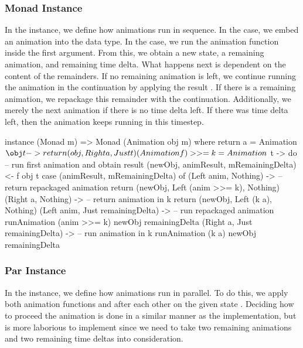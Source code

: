 \subsubsection{Monad Instance}

In the  instance, we define how animations run in sequence. In the  case, we embed an animation into the  data type. In the \hs{>>=} case, we run the animation function inside the first argument. From this, we obtain a new state, a remaining animation, and remaining time delta. What happens next is dependent on the content of the remainders. If no remaining animation is left, we continue running the animation in the continuation  by applying the result . If there is a remaining animation, we repackage this remainder with the continuation. Additionally, we merely  the next animation if there is no time delta left. If there was time delta left, then the animation keeps running in this timestep.

\begin{code}
instance (Monad m) => Monad (Animation obj m) where
  return a = Animation $ \obj t -> return (obj, Right a, Just t)
  (Animation f) >>= k = Animation $ \obj t -> do
    -- run first animation and obtain result
    (newObj, animResult, mRemainingDelta) <- f obj t
    case (animResult, mRemainingDelta) of
      (Left anim, Nothing) -> -- return repackaged animation
        return (newObj, Left (anim >>= k), Nothing)
      (Right a, Nothing) -> -- return animation in k
        return (newObj, Left (k a), Nothing)
      (Left anim, Just remainingDelta) -> -- run repackaged animation
        runAnimation (anim >>= k) newObj remainingDelta
      (Right a, Just remainingDelta) -> -- run animation in k
        runAnimation (k a) newObj remainingDelta
\end{code}

\subsubsection{Par Instance}

In the  instance, we define how animations run in parallel. To do this, we apply both animation functions  and  after each other on the given state . Deciding how to proceed the animation is done in a similar manner as the  implementation, but is more laborious to implement since we need to take two remaining animations and two remaining time deltas into consideration.

